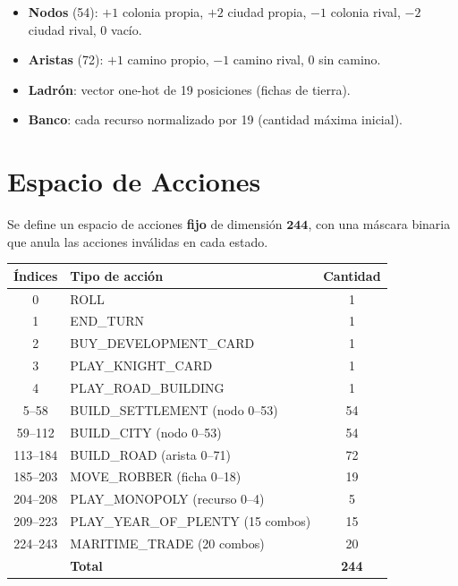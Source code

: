 \documentclass[11pt, a4paper]{article}
\begin{document}
\begin{itemize}[noitemsep]
  \item \textbf{Nodos} (54): $+1$ colonia propia, $+2$ ciudad propia,
        $-1$ colonia rival, $-2$ ciudad rival, $0$ vacío.
  \item \textbf{Aristas} (72): $+1$ camino propio, $-1$ camino rival, $0$ sin camino.
  \item \textbf{Ladrón}: vector one-hot de 19 posiciones (fichas de tierra).
  \item \textbf{Banco}: cada recurso normalizado por 19 (cantidad máxima inicial).
\end{itemize}


\section{Espacio de Acciones}

Se define un espacio de acciones \textbf{fijo} de dimensión $\mathbf{244}$, con una
máscara binaria que anula las acciones inválidas en cada estado.

\begin{center}
\begin{tabular}{clc}
  \toprule
  \textbf{Índices} & \textbf{Tipo de acción} & \textbf{Cantidad} \\
  \midrule
  0        & ROLL                              & 1  \\
  1        & END\_TURN                         & 1  \\
  2        & BUY\_DEVELOPMENT\_CARD            & 1  \\
  3        & PLAY\_KNIGHT\_CARD                & 1  \\
  4        & PLAY\_ROAD\_BUILDING              & 1  \\
  5--58    & BUILD\_SETTLEMENT (nodo 0--53)    & 54 \\
  59--112  & BUILD\_CITY (nodo 0--53)          & 54 \\
  113--184 & BUILD\_ROAD (arista 0--71)        & 72 \\
  185--203 & MOVE\_ROBBER (ficha 0--18)        & 19 \\
  204--208 & PLAY\_MONOPOLY (recurso 0--4)     & 5  \\
  209--223 & PLAY\_YEAR\_OF\_PLENTY (15 combos)& 15 \\
  224--243 & MARITIME\_TRADE (20 combos)       & 20 \\
  \midrule
  & \textbf{Total}                            & \textbf{244} \\
  \bottomrule
\end{tabular}
\end{center}
\end{document}
